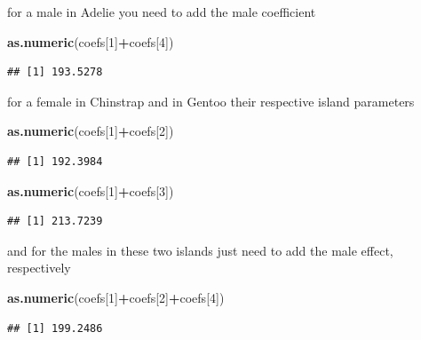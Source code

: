 \documentclass[
]{book}
\newenvironment{Shaded}{\begin{snugshade}}{\end{snugshade}}
\newcommand{\DecValTok}[1]{\textcolor[rgb]{0.00,0.00,0.81}{#1}}
\newcommand{\FunctionTok}[1]{\textcolor[rgb]{0.13,0.29,0.53}{\textbf{#1}}}
\newcommand{\NormalTok}[1]{#1}
\newcommand{\SpecialCharTok}[1]{\textcolor[rgb]{0.81,0.36,0.00}{\textbf{#1}}}
\begin{document}
for a male in Adelie you need to add the male coefficient

\begin{Shaded}
\begin{Highlighting}[]
\FunctionTok{as.numeric}\NormalTok{(coefs[}\DecValTok{1}\NormalTok{]}\SpecialCharTok{+}\NormalTok{coefs[}\DecValTok{4}\NormalTok{])}
\end{Highlighting}
\end{Shaded}

\begin{verbatim}
## [1] 193.5278
\end{verbatim}

for a female in Chinstrap and in Gentoo their respective island parameters

\begin{Shaded}
\begin{Highlighting}[]
\FunctionTok{as.numeric}\NormalTok{(coefs[}\DecValTok{1}\NormalTok{]}\SpecialCharTok{+}\NormalTok{coefs[}\DecValTok{2}\NormalTok{])}
\end{Highlighting}
\end{Shaded}

\begin{verbatim}
## [1] 192.3984
\end{verbatim}

\begin{Shaded}
\begin{Highlighting}[]
\FunctionTok{as.numeric}\NormalTok{(coefs[}\DecValTok{1}\NormalTok{]}\SpecialCharTok{+}\NormalTok{coefs[}\DecValTok{3}\NormalTok{])}
\end{Highlighting}
\end{Shaded}

\begin{verbatim}
## [1] 213.7239
\end{verbatim}

and for the males in these two islands just need to add the male effect, respectively

\begin{Shaded}
\begin{Highlighting}[]
\FunctionTok{as.numeric}\NormalTok{(coefs[}\DecValTok{1}\NormalTok{]}\SpecialCharTok{+}\NormalTok{coefs[}\DecValTok{2}\NormalTok{]}\SpecialCharTok{+}\NormalTok{coefs[}\DecValTok{4}\NormalTok{])}
\end{Highlighting}
\end{Shaded}

\begin{verbatim}
## [1] 199.2486
\end{verbatim}
\end{document}
